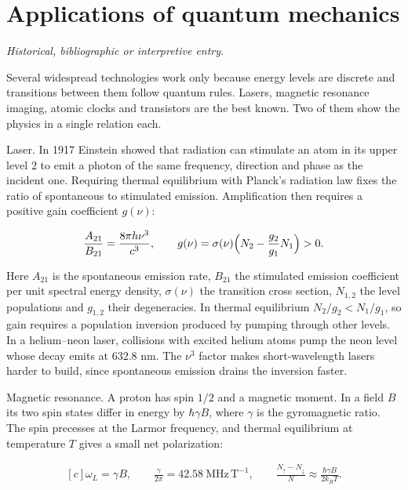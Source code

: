 \documentclass[11pt,oneside]{book}
\newenvironment{centeredalign}{\[\begin{gathered}[c]}{\end{gathered}\]}
\begin{document}
\clearpage

\section{Applications of quantum mechanics}

\label{topic:applications-of-quantum-mechanics}

\par\smallskip\noindent\textit{Historical, bibliographic or interpretive entry.}

Several widespread technologies work only because energy levels are discrete and transitions between them follow quantum rules. Lasers, magnetic resonance imaging, atomic clocks and transistors are the best known. Two of them show the physics in a single relation each.

Laser. In 1917 Einstein showed that radiation can stimulate an atom in its upper level \(2\) to emit a photon of the same frequency, direction and phase as the incident one. Requiring thermal equilibrium with Planck's radiation law fixes the ratio of spontaneous to stimulated emission. Amplification then requires a positive gain coefficient \(g(\nu)\):

\begin{centeredalign}
\frac{A_{21}}{B_{21}}=\frac{8\pi h\nu^3}{c^3},\qquad
g(\nu)=\sigma(\nu)\Bigl(N_2-\frac{g_2}{g_1}N_1\Bigr)>0 .
\end{centeredalign}

Here \(A_{21}\) is the spontaneous emission rate, \(B_{21}\) the stimulated emission coefficient per unit spectral energy density, \(\sigma(\nu)\) the transition cross section, \(N_{1,2}\) the level populations and \(g_{1,2}\) their degeneracies. In thermal equilibrium \(N_2/g_2<N_1/g_1\), so gain requires a population inversion produced by pumping through other levels. In a helium--neon laser, collisions with excited helium atoms pump the neon level whose decay emits at \(632.8\) nm. The \(\nu^3\) factor makes short-wavelength lasers harder to build, since spontaneous emission drains the inversion faster.

Magnetic resonance. A proton has spin \(1/2\) and a magnetic moment. In a field \(B\) its two spin states differ in energy by \(\hbar\gamma B\), where \(\gamma\) is the gyromagnetic ratio. The spin precesses at the Larmor frequency, and thermal equilibrium at temperature \(T\) gives a small net polarization:

\begin{centeredalign}
\omega_L=\gamma B,\qquad \frac{\gamma}{2\pi}=42.58\ \mathrm{MHz\,T^{-1}},\qquad
\frac{N_\uparrow-N_\downarrow}{N}\approx\frac{\hbar\gamma B}{2k_BT}.
\end{centeredalign}
\end{document}
